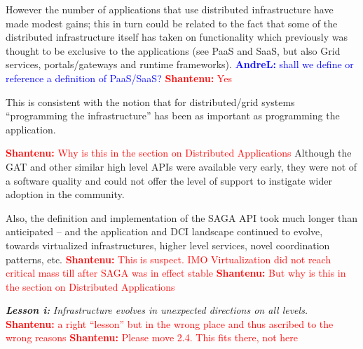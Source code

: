 \documentclass[]{article}
\newcommand{\I}[1]{\textit{#1}}
\newcommand{\B}[1]{\textbf{#1}}
\newcommand{\BI}[1]{\textbf{\textit{#1}}}
\newcommand{\jhanote}[1]{{\textcolor{red}{     \B{Shantenu:} #1 }}}
\newcommand{\alnote}[1]{{\textcolor{blue}{    \B{AndreL:  } #1 }}}
\newcommand{\jhanote}[1]{}
\newcommand{\alnote}[1]{}
\begin{document}
However the number of applications that use distributed infrastructure
have made modest gains; this in turn could be related to the fact that
some of the distributed infrastructure itself has taken on
functionality which previously was thought to be exclusive to the
applications (see PaaS and SaaS, but also Grid services,
portals/gateways and runtime frameworks). \alnote{shall we define or
  reference a definition of PaaS/SaaS?}\jhanote{Yes}

This is consistent with the notion that for distributed/grid systems
``programming the infrastructure'' has been as important as
programming the application.




\jhanote{Why is this in the section on Distributed Applications}
Although the GAT and other similar high level APIs were available very
early, they were not of a software quality and could not offer the
level of support to instigate wider adoption in the community.

Also, the definition and implementation of the SAGA API took much
longer than anticipated -- and the application and DCI landscape
continued to evolve, towards virtualized infrastructures, higher level
services, novel coordination patterns, etc.  \jhanote{This is
  suspect. IMO Virtualization did not reach critical mass till after
  SAGA was in effect stable} \jhanote{But why is this in the section
  on Distributed Applications}

\BI{Lesson i:} \I{Infrastructure evolves in unexpected directions  on
  all levels.}  \jhanote{a right ``lesson'' but in the wrong place and
  thus ascribed to the wrong reasons} \jhanote{Please move 2.4. This
  fits there, not here}
\end{document}
